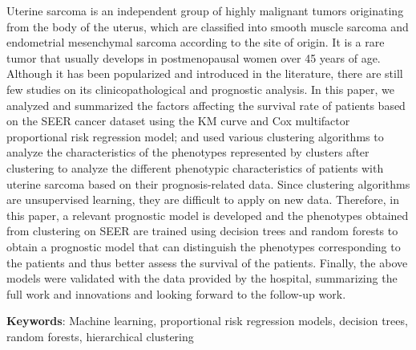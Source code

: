 Uterine sarcoma is an independent group of highly malignant tumors originating from the body of the uterus, which are classified into smooth muscle sarcoma and endometrial mesenchymal sarcoma according to the site of origin. It is a rare tumor that usually develops in postmenopausal women over 45 years of age. Although it has been popularized and introduced in the literature, there are still few studies on its clinicopathological and prognostic analysis. In this paper, we analyzed and summarized the factors affecting the survival rate of patients based on the SEER cancer dataset using the KM curve and Cox multifactor proportional risk regression model; and used various clustering algorithms to analyze the characteristics of the phenotypes represented by clusters after clustering to analyze the different phenotypic characteristics of patients with uterine sarcoma based on their prognosis-related data. Since clustering algorithms are unsupervised learning, they are difficult to apply on new data. Therefore, in this paper, a relevant prognostic model is developed and the phenotypes obtained from clustering on SEER are trained using decision trees and random forests to obtain a prognostic model that can distinguish the phenotypes corresponding to the patients and thus better assess the survival of the patients. Finally, the above models were validated with the data provided by the hospital, summarizing the full work and innovations and looking forward to the follow-up work.

\vspace{8mm}

\textbf{Keywords}: Machine learning, proportional risk regression models, decision trees, random forests, hierarchical clustering